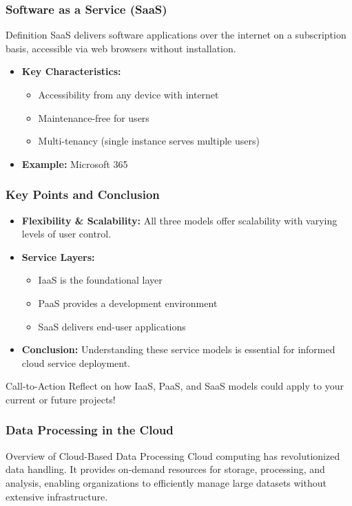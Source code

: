 \documentclass[aspectratio=169]{beamer}
\begin{document}
\begin{frame}[fragile]
    \frametitle{Software as a Service (SaaS)}
    \begin{block}{Definition}
        SaaS delivers software applications over the internet on a subscription basis, accessible via web browsers without installation.
    \end{block}
    \begin{itemize}
        \item \textbf{Key Characteristics:}
        \begin{itemize}
            \item Accessibility from any device with internet
            \item Maintenance-free for users
            \item Multi-tenancy (single instance serves multiple users)
        \end{itemize}
        \item \textbf{Example:} Microsoft 365
    \end{itemize}
\end{frame}

\begin{frame}[fragile]
    \frametitle{Key Points and Conclusion}
    \begin{itemize}
        \item \textbf{Flexibility \& Scalability:} All three models offer scalability with varying levels of user control.
        \item \textbf{Service Layers:}
        \begin{itemize}
            \item IaaS is the foundational layer
            \item PaaS provides a development environment
            \item SaaS delivers end-user applications
        \end{itemize}
        \item \textbf{Conclusion:} Understanding these service models is essential for informed cloud service deployment.
    \end{itemize}
    \begin{block}{Call-to-Action}
        Reflect on how IaaS, PaaS, and SaaS models could apply to your current or future projects!
    \end{block}
\end{frame}

\begin{frame}[fragile]
    \frametitle{Data Processing in the Cloud}
    \begin{block}{Overview of Cloud-Based Data Processing}
        Cloud computing has revolutionized data handling. It provides on-demand resources for storage, processing, and analysis, enabling organizations to efficiently manage large datasets without extensive infrastructure.
    \end{block}
\end{frame}
\end{document}
